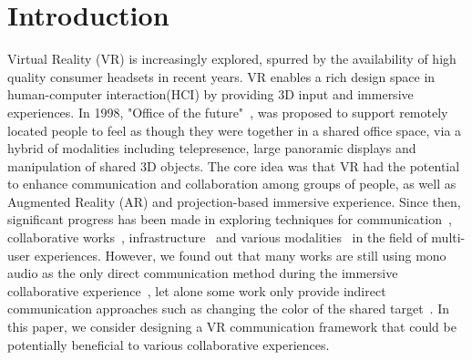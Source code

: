 \documentclass{sigchi}
\begin{document}
\section{Introduction}
Virtual Reality (VR) is increasingly explored, spurred by the availability of high quality consumer headsets in recent years. VR enables a rich design space in human-computer interaction(HCI) by providing 3D input and immersive experiences. In 1998, "Office of the future"~\cite{raskar1998office}, was proposed to support remotely located people to feel as though they were together in a shared office space, via a hybrid of modalities including telepresence, large panoramic displays and manipulation of shared 3D objects. The core idea was that VR had the potential to enhance communication and collaboration among groups of people, as well as Augmented Reality (AR) and projection-based immersive experience. Since then, significant progress has been made in exploring techniques for communication~\cite{ishii1993integration, otsuka2016mmspace}, collaborative works~\cite{kunert2014photoportals,tang2010three}, infrastructure~\cite{maimone2013general, o2011blended, thomas2014muvr} and various modalities~\cite{follmer2013inform, leithinger2014physical, leithinger2015shape, nakagaki2019inforce} in the field of multi-user experiences. However, we found out that many works are still using mono audio as the only direct communication method during the immersive collaborative experience~\cite{xia2018spacetime}, let alone some work only provide indirect communication approaches such as changing the color of the shared target~\cite{huo2018synchronizar}. In this paper, we consider designing a VR communication framework that could be potentially beneficial to various collaborative experiences.
\end{document}
